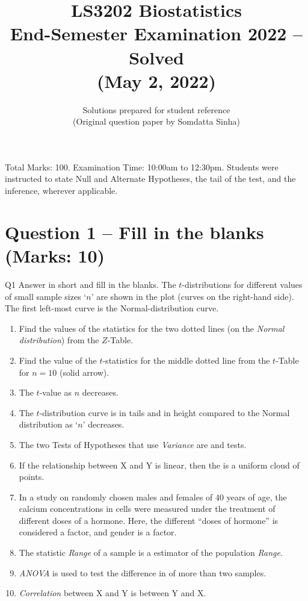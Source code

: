 \documentclass[11pt]{article}
\title{\textbf{LS3202 Biostatistics \\ End-Semester Examination 2022 -- Solved} \\ \large (May 2, 2022)}
\author{Solutions prepared for student reference \\ \small (Original question paper by Somdatta Sinha)}
\date{}
\begin{document}
\maketitle

\begin{tcolorbox}[colback=notecolor!8, colframe=notecolor, title=Note on this paper]
Total Marks: 100. Examination Time: 10:00am to 12:30pm. Students were instructed to state Null and Alternate Hypotheses, the tail of the test, and the inference, wherever applicable.
\end{tcolorbox}

\tableofcontents
\vspace{1em}

\section{Question 1 -- Fill in the blanks (Marks: 10)}
\begin{question}{Q1}
Answer in short and fill in the blanks. The $t$-distributions for different values of small sample sizes `$n$' are shown in the plot (curves on the right-hand side). The first left-most curve is the Normal-distribution curve.
\begin{enumerate}[label=(\roman*)]
\item Find the values of the statistics for the two dotted lines (on the \emph{Normal distribution}) from the $Z$-Table.
\item Find the value of the $t$-statistics for the middle dotted line from the $t$-Table for $n=10$ (solid arrow).
\item The $t$-value \underline{\quad} as $n$ decreases.
\item The $t$-distribution curve is \underline{\quad} in tails and \underline{\quad} in height compared to the Normal distribution as `$n$' decreases.
\item The two Tests of Hypotheses that use \emph{Variance} are \underline{\quad} and \underline{\quad} tests.
\item If the relationship between X and Y is linear, then the \underline{\quad} is a uniform cloud of points.
\item In a study on randomly chosen males and females of 40 years of age, the calcium concentrations in cells were measured under the treatment of different doses of a hormone. Here, the different ``doses of hormone'' is considered a \underline{\quad} factor, and gender is a \underline{\quad} factor.
\item The statistic \emph{Range} of a sample is a \underline{\quad} estimator of the population \emph{Range}.
\item \emph{ANOVA} is used to test the difference in \underline{\quad} of more than two samples.
\item \emph{Correlation} between X and Y is \underline{\quad} between Y and X.
\end{enumerate}
\end{question}
\end{document}
